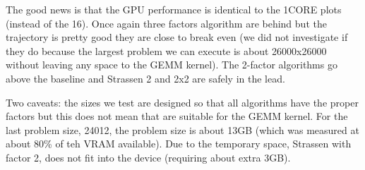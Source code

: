 \documentclass[acmsmall]{acmart}
\begin{document}
The good news is that the GPU performance is identical to the 1CORE
plots (instead of the 16). Once again three factors algorithm are
behind but the trajectory is pretty good they are close to break even
(we did not investigate if they do because the largest problem we can
execute is about 26000x26000 without leaving any space to the GEMM
kernel). The 2-factor algorithms go above the baseline and Strassen 2
and 2x2 are safely in the lead.


Two caveats: the sizes we test are designed so that all algorithms have
the proper factors but this does not mean that are suitable for the
GEMM kernel. For the last problem size, 24012, the problem size is
about 13GB (which was measured at about 80\% of teh VRAM
available). Due to the temporary space, Strassen with factor 2, does
not fit into the device (requiring about extra 3GB).  


  







%

 

%
\end{document}

